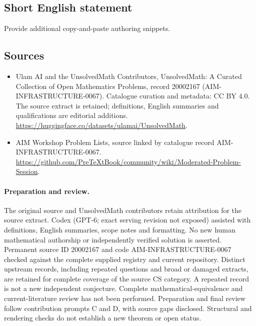 \documentclass[11pt]{article}
\begin{document}
\subsection{Short English statement}
Provide additional copy-and-paste authoring snippets.
\subsection{Sources}
\begin{itemize}
\item[\hypertarget{source:20002167:1}{S1}] Ulam AI and the UnsolvedMath Contributors, UnsolvedMath: A Curated Collection of Open Mathematics Problems, record 20002167 (AIM-INFRASTRUCTURE-0067). Catalogue curation and metadata: CC BY 4.0. The source extract is retained; definitions, English summaries and qualifications are editorial additions.
\url{https://huggingface.co/datasets/ulamai/UnsolvedMath}.
\item[\hypertarget{source:20002167:2}{S2}] AIM Workshop Problem Lists, source linked by catalogue record AIM-INFRASTRUCTURE-0067.
\url{https://github.com/PreTeXtBook/community/wiki/Moderated-Problem-Session}.
\end{itemize}
\paragraph{Preparation and review.}
The original source and UnsolvedMath contributors retain attribution for the source extract. Codex (GPT-6; exact serving revision not exposed) assisted with definitions, English summaries, scope notes and formatting. No new human mathematical authorship or independently verified solution is asserted. Permanent source ID 20002167 and code AIM-INFRASTRUCTURE-0067 checked against the complete supplied registry and current repository. Distinct upstream records, including repeated questions and broad or damaged extracts, are retained for complete coverage of the source CS category. A repeated record is not a new independent conjecture. Complete mathematical-equivalence and current-literature review has not been performed. Preparation and final review follow contribution prompts C and D, with source gaps disclosed. Structural and rendering checks do not establish a new theorem or open status.
\label{end:20002167}
\end{document}

